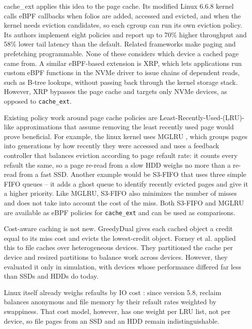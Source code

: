 \documentclass[11pt,sigconf,nonacm]{acmart}
\begin{document}
cache\_ext \cite{cacheext} applies this idea to the page cache. Its modified Linux 6.6.8 kernel calls eBPF callbacks when folios are added, accessed and evicted, and when the kernel needs eviction candidates, so each cgroup can run its own eviction policy. Its authors implement eight policies and report up to 70\% higher throughput and 58\% lower tail latency than the default. Related frameworks make paging \cite{pageflex} and prefetching \cite{fetchbpf} programmable. None of these considers which device a cached page came from.
A similar eBPF-based extension is XRP\cite{xrp}, which lets applications run custom eBPF functions in the NVMe driver to issue chains of dependent reads, such as B-tree lookups, without passing back through the kernel storage stack. However, XRP\cite{xrp} bypasses the page cache and targets only NVMe devices, as opposed to \texttt{cache\_ext}\cite{cacheext}.

Existing policy work around page cache policies are Least-Recently-Used-(LRU)-like approximations that assume removing the least recently used page would prove beneficial. For example, the linux kernel uses MGLRU \cite{multigenlru}, which groups pages into generations by how recently they were accessed and uses a feedback controller that balances eviction according to page refault rate: it counts every refault the same, so a page re-read from a slow HDD weighs no more than a re-read from a fast SSD. Another example would be S3-FIFO \cite{s3fifo} that uses three simple FIFO queues -- it adds a ghost queue to identify recently evicted pages and give it a higher priority. Like MGLRU, S3-FIFO also minimizes the number of misses and does not take into account the cost of the miss. Both S3-FIFO and MGLRU are available as eBPF policies for \texttt{cache\_ext} and can be used as comparisons.

Cost-aware caching is not new. GreedyDual \cite{greedydual} gives each cached object a credit equal to its miss cost and evicts the lowest-credit object. Forney et al. \cite{forney} applied this to file caches over heterogeneous devices. They partitioned the cache per device and resized partitions to balance work across devices. However, they evaluated it only in simulation, with devices whose performance differed far less than SSDs and HDDs do today.

 Linux itself already weighs refaults by IO cost \cite{lrubalance}: since version 5.8, reclaim balances anonymous and file memory by their refault rates weighted by swappiness. That cost model, however, has one weight per LRU list, not per device, so file pages from an SSD and an HDD remain indistinguishable.
\end{document}
